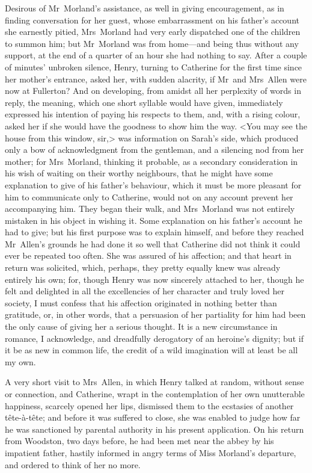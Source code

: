  Desirous of Mr~Morland's assistance, as well in giving encouragement, as in finding conversation for her guest, whose embarrassment on his father's account she earnestly pitied, Mrs~Morland had very early dispatched one of the children to summon him; but Mr~Morland was from home—and being thus without any support, at the end of a quarter of an hour she had nothing to say. After a couple of minutes' unbroken silence, Henry, turning to Catherine for the first time since her mother's entrance, asked her, with sudden alacrity, if Mr~and Mrs~Allen were now at Fullerton? And on developing, from amidst all her perplexity of words in reply, the meaning, which one short syllable would have given, immediately expressed his intention of paying his respects to them, and, with a rising colour, asked her if she would have the goodness to show him the way. <You may see the house from this window, sir,> was information on Sarah's side, which produced only a bow of acknowledgment from the gentleman, and a silencing nod from her mother; for Mrs~Morland, thinking it probable, as a secondary consideration in his wish of waiting on their worthy neighbours, that he might have some explanation to give of his father's behaviour, which it must be more pleasant for him to communicate only to Catherine, would not on any account prevent her accompanying him. They began their walk, and Mrs~Morland was not entirely mistaken in his object in wishing it. Some explanation on his father's account he had to give; but his first purpose was to explain himself, and before they reached Mr~Allen's grounds he had done it so well that Catherine did not think it could ever be repeated too often. She was assured of his affection; and that heart in return was solicited, which, perhaps, they pretty equally knew was already entirely his own; for, though Henry was now sincerely attached to her, though he felt and delighted in all the excellencies of her character and truly loved her society, I must confess that his affection originated in nothing better than gratitude, or, in other words, that a persuasion of her partiality for him had been the only cause of giving her a serious thought. It is a new circumstance in romance, I acknowledge, and dreadfully derogatory of an heroine's dignity; but if it be as new in common life, the credit of a wild imagination will at least be all my own. 

 A very short visit to Mrs~Allen, in which Henry talked at random, without sense or connection, and Catherine, wrapt in the contemplation of her own unutterable happiness, scarcely opened her lips, dismissed them to the ecstasies of another tête-à-tête; and before it was suffered to close, she was enabled to judge how far he was sanctioned by parental authority in his present application. On his return from Woodston, two days before, he had been met near the abbey by his impatient father, hastily informed in angry terms of Miss Morland's departure, and ordered to think of her no more. 

